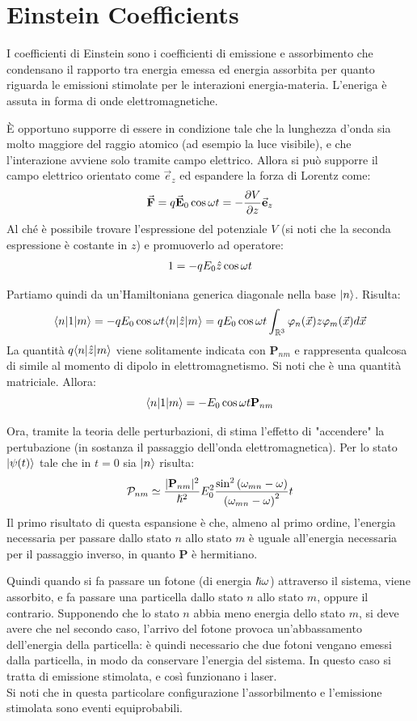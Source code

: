 \section{Einstein Coefficients}
I coefficienti di Einstein sono i coefficienti di emissione e assorbimento che condensano il rapporto tra energia emessa ed energia assorbita per quanto riguarda le emissioni stimolate per le interazioni energia-materia. L'eneriga è assuta in forma di onde elettromagnetiche.
\tab

È opportuno supporre di essere in condizione tale che la lunghezza d'onda sia molto maggiore del raggio atomico (ad esempio la luce visibile), e che l'interazione avviene solo tramite campo elettrico. Allora si può supporre il campo elettrico orientato come $\vec e_z$ ed espandere la forza di Lorentz come:
\[
    \vect{F} = q \vect{E}_0 \cos \omega t = -\deriv[z]{V} \vect {e}_z
\]
Al ché è possibile trovare l'espressione del potenziale $V$ (si noti che la seconda espressione è costante in $z$) e promuoverlo ad operatore:
\[
    \V = -q E_0 \hat z \cos \omega t
\] 

Partiamo quindi da un'Hamiltoniana generica diagonale nella base $\Ket n$. Risulta:
\[
    \braketin{n}{\V}{m} = -qE_0\cos\omega t \braketin{n}{\hat z}{m} = qE_0\cos\omega t \rnint[3] \vphi_n(\vec x) z \vphi_m(\vec x) d\vec x
\]
La quantità $q \braketin{n}{\hat z}{m}$ viene solitamente indicata con $\mathbf{P}_{nm}$ e rappresenta qualcosa di simile al momento di dipolo in elettromagnetismo. Si noti che è una quantità matriciale. Allora:
\[
    \braketin{n}{\V}{m} = -E_0\cos\omega t \mathbf{P}_{nm}
\]

Ora, tramite la teoria delle perturbazioni, di stima l'effetto di "accendere" la pertubazione (in sostanza il passaggio dell'onda elettromagnetica). Per lo stato $\Ket{\psi(t)}$ tale che in $t = 0$ sia $\Ket n$ risulta:
\[
    \P_{nm} \simeq \frac{\sabs{\mathbf{P}_{nm}}}{\h^2}E_0^2 \frac{\sin^2 \l\omega_{mn}-\omega\r}{ \l\omega_{mn}-\omega\r^2}t
\]
Il primo risultato di questa espansione è che, almeno al primo ordine, l'energia necessaria per passare dallo stato $n$ allo stato $m$ è uguale all'energia necessaria per il passaggio inverso, in quanto $\mathbf P$ è hermitiano.

Quindi quando si fa passare un fotone (di energia $\h\omega$) attraverso il sistema, viene assorbito, e fa passare una particella dallo stato $n$ allo stato $m$, oppure il contrario. Supponendo che lo stato $n$ abbia meno energia dello stato $m$, si deve avere che nel secondo caso, l'arrivo del fotone provoca un'abbassamento dell'energia della particella: è quindi necessario che due fotoni vengano emessi dalla particella, in modo da conservare l'energia del sistema. In questo caso si tratta di emissione stimolata, e così funzionano i laser.\\
Si noti che in questa particolare configurazione l'assorbilmento e l'emissione stimolata sono eventi equiprobabili.
\tab

